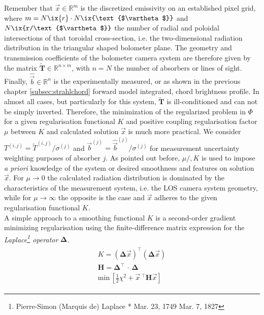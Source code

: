     Remember that $\vec{x}\in\mathbb{R}^{m}$ is the discretized emissivity on an established pixel grid, where $m=N\ix{r}\cdot N\ix{\text{$\vartheta$}}$ and $N\ix{r/\text{$\vartheta$}}$ the number of radial and poloidal intersections of that toroidal cross-section, i.e. the two-dimensional radiation distribution in the triangular shaped bolometer plane. The geometry and transmission coefficients of the bolometer camera system are therefore given by the matrix $\mathbf{\widetilde{T}}\in\mathbb{R}^{n\times m}$, with $n=N$ the number of absorbers or lines of sight. Finally, $\mathrel{\hat{\vec{b}}}\in\mathbb{R}^{n}$ is the experimentally measured, or as shown in the previous chapter \cref{subsec:strahlchord} forward model integrated, chord brightness profile. In almost all cases, but particularly for this system, $\mathbf{\widetilde{T}}$ is ill-conditioned and can not be simply inverted. Therefore, the minimization of the regularized problem in $\Phi$ for a given regularisation functional $K$ and positive coupling regularisation factor $\mu$ between $K$ and calculated solution $\vec{x}$ is much more practical. We consider $T^{\left(i,j\right)}=\widetilde{T}^{\left(i,j\right)}/\sigma^{\left(j\right)}$ and $\vec{b}^{\left(j\right)}=\mathrel{\hat{\vec{b}}^{\left(j\right)}}/\sigma^{\left(j\right)}$ for measurement uncertainty weighting purposes of absorber $j$. As pointed out before, $\mu/,K$ is used to impose \textit{a priori} knowledge of the system or desired smoothness and features on solution $\vec{x}$. For $\mu\rightarrow0$ the calculated radiation distribution is dominated by the characteristics of the measurement system, i.e. the LOS camera system geometry, while for $\mu\rightarrow\infty$ the opposite is the case and $\vec{x}$ adheres to the given regularisation functional $K$.\\%
    A simple approach to a smoothing functional $K$ is a second-order gradient minimizing regularisation using the finite-difference matrix expression for the \textit{Laplace\footnote[1]{Pierre-Simon (Marquis de) Laplace * Mar. 23, 1749 \textdagger Mar. 7, 1827} operator} $\pmb{\Delta}$.%
%
    \begin{align}%
        \begin{split}\label{eq:linearregular}%
            K=\left(\pmb{\Delta}\vec{x}\right)^{\intercal}\left(\pmb{\Delta}\vec{x}\right)\\%
            \mathbf{H}=\pmb{\Delta}^{\intercal}\,\cdot\,\pmb{\Delta}\\%
            \text{min}\,\left[\frac{1}{2}\chi^{2}+\vec{x}\,^{\intercal}\mathbf{H}\vec{x}\right]%
        \end{split}%
    \end{align}%
